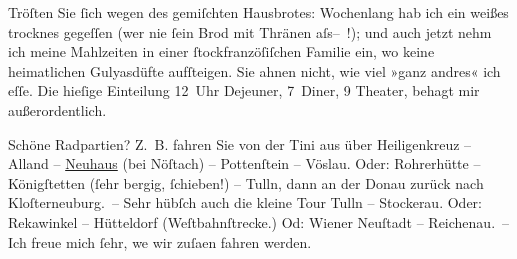 \pstart
           Tröſten Sie{ }ſich wegen des gemiſchten Hausbrotes: Wochenlang hab ich ein weißes
               trocknes gegeſſen (wer nie{ }ſein Brod mit Thränen
                  aſs– !); und auch jetzt nehm ich meine Mahlzeiten in einer ſtockfranzöſiſchen Familie ein, wo keine heimatlichen {\pb}Gulyasdüfte aufſteigen. Sie ahnen nicht, wie viel »ganz
               andres« ich eſſe. Die hieſige Einteilung 12 Uhr Dejeuner, 7 Diner, 9 Theater, behagt
               mir außerordentlich.\pend
           
\pstart
           Schöne Radpartien? Z. B. fahren Sie von der Tini aus über Heiligenkreuz – Alland – \uline{Neuhaus} (bei Nöſtach) – Pottenſtein – Vöslau. Oder:
               Rohrerhütte – Königſtetten (ſehr bergig,{ }ſchieben!) – Tulln, dann an der Donau zurück nach Kloſterneuburg. – Sehr hübſch auch die kleine
               Tour Tulln – Stockerau. {\pb}Oder: Rekawinkel – Hütteldorf
               (Weſtbahnſtrecke.) Od: Wiener Neuſtadt – Reichenau. – Ich freue mich{ }ſehr, we{\geminationn} wir zuſa{\geminationm}en fahren
               werden.\pend
           
